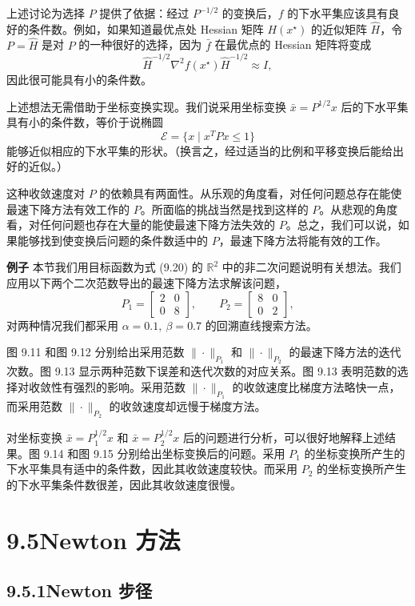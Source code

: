 \documentclass[UTF8,12pt,a4paper,fontset=fandol]{ctexart}
\begin{document}
上述讨论为选择 $P$ 提供了依据：经过 $P^{-1/2}$ 的变换后，$f$ 的下水平集应该具有良好的条件数。例如，如果知道最优点处 Hessian 矩阵 $H(x^\star)$ 的近似矩阵 $\hat{H}$，令 $P=\hat{H}$ 是对 $P$ 的一种很好的选择，因为 $\bar{f}$ 在最优点的 Hessian 矩阵将变成
\[
\hat{H}^{-1/2}\nabla^2 f(x^\star)\hat{H}^{-1/2}\approx I,
\]
因此很可能具有小的条件数。

上述想法无需借助于坐标变换实现。我们说采用坐标变换 $\bar{x}=P^{1/2}x$ 后的下水平集具有小的条件数，等价于说椭圆
\[
\mathcal{E}=\{x\mid x^TPx\leq1\}
\]
能够近似相应的下水平集的形状。（换言之，经过适当的比例和平移变换后能给出好的近似。）

这种收敛速度对 $P$ 的依赖具有两面性。从乐观的角度看，对任何问题总存在能使最速下降方法有效工作的 $P$。所面临的挑战当然是找到这样的 $P$。从悲观的角度看，对任何问题也存在大量的能使最速下降方法失效的 $P$。总之，我们可以说，如果能够找到使变换后问题的条件数适中的 $P$，最速下降方法将能有效的工作。

\noindent\textbf{例子}\quad
本节我们用目标函数为式 (9.20) 的 $\mathbb{R}^2$ 中的非二次问题说明有关想法。我们应用以下两个二次范数导出的最速下降方法求解该问题，
\[
P_1=\begin{bmatrix}2&0\\0&8\end{bmatrix},\qquad
P_2=\begin{bmatrix}8&0\\0&2\end{bmatrix},
\]
对两种情况我们都采用 $\alpha=0.1,\ \beta=0.7$ 的回溯直线搜索方法。

图 9.11 和图 9.12 分别给出采用范数 $\|\cdot\|_{P_1}$ 和 $\|\cdot\|_{P_2}$ 的最速下降方法的迭代次数。图 9.13 显示两种范数下误差和迭代次数的对应关系。图 9.13 表明范数的选择对收敛性有强烈的影响。采用范数 $\|\cdot\|_{P_1}$ 的收敛速度比梯度方法略快一点，而采用范数 $\|\cdot\|_{P_2}$ 的收敛速度却远慢于梯度方法。

对坐标变换 $\bar{x}=P_1^{1/2}x$ 和 $\bar{x}=P_2^{1/2}x$ 后的问题进行分析，可以很好地解释上述结果。图 9.14 和图 9.15 分别给出坐标变换后的问题。采用 $P_1$ 的坐标变换所产生的下水平集具有适中的条件数，因此其收敛速度较快。而采用 $P_2$ 的坐标变换所产生的下水平集条件数很差，因此其收敛速度很慢。

\section*{9.5\quad Newton 方法}

\subsection*{9.5.1\quad Newton 步径}
\end{document}
